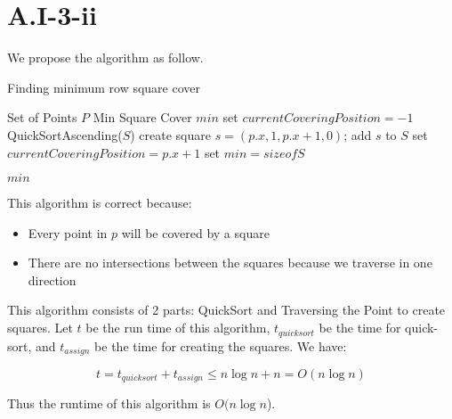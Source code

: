 \section*{A.I-3-ii}
\label{a-1-3-2}
We propose the algorithm as follow.

\begin{algorithm}
  \caption{Finding minimum row square cover}
  \label{alg:row_minimum}
  \begin{algorithmic}
    \Require Set of Points $P$
    \Ensure Min Square Cover $min$
    \renewcommand{\algorithmicrequire}{\textbf{Input:}}
    \renewcommand{\algorithmicensure}{\textbf{Output:}}
    \algnewcommand{}
    \algnewcommand\Operation{\item[\algorithmicoperation]}
    \Operation
    \State set $currentCoveringPosition = -1$
    \State QuickSortAscending($S$)
    \State create square $s = (p.x, 1, p.x + 1, 0)$;
    \State add $s$ to $S$
    \State set $currentCoveringPosition = p.x + 1$
    \EndIf
    \State set $min = size of S$

    \Return $min$
    \EndFor
  \end{algorithmic}
\end{algorithm}

This algorithm is correct because:

\begin{itemize}
    \item Every point in $p$ will be covered by a square
    \item There are no intersections between the squares because we traverse in one direction
  \end{itemize}

  This algorithm consists of 2 parts: QuickSort and Traversing the Point to create squares. Let $t$ be the run time of this algorithm, $t_{quicksort}$ be the time for quick-sort, and $t_{assign}$ be the time for creating the squares. We have:

  \begin{equation}
    t = t_{quicksort} + t_{assign} \leq n\log n + n = O(n\log n)
  \end{equation}

  Thus the runtime of this algorithm is $O(n\log n$).
